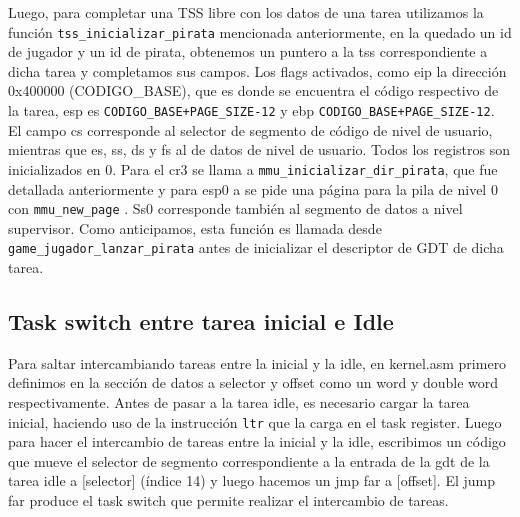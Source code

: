 Luego, para completar una TSS libre con los datos de una tarea utilizamos la función \texttt{tss\_inicializar\_pirata} mencionada anteriormente, en la quedado un id de jugador y un id de pirata, obtenemos un puntero a la tss correspondiente a dicha tarea y completamos sus campos. Los flags activados, como eip la dirección 0x400000 (CODIGO\_BASE), que es donde se encuentra el código respectivo de la tarea, esp es \texttt{CODIGO\_BASE+PAGE\_SIZE-12} y ebp \texttt{CODIGO\_BASE+PAGE\_SIZE-12}. El campo cs corresponde al selector de segmento de código de nivel de usuario, mientras que es, ss, ds y fs al de datos de nivel de usuario. Todos los registros son inicializados en 0. 
Para el cr3 se llama a \texttt{mmu\_inicializar\_dir\_pirata}, que fue detallada anteriormente y para  esp0 a  se pide una página para la pila de nivel 0 con \texttt{mmu\_new\_page} . Ss0 corresponde también al segmento de datos a nivel supervisor. Como anticipamos, esta función es llamada desde \texttt{game\_jugador\_lanzar\_pirata} antes de inicializar el descriptor de GDT de dicha tarea.

\subsection{Task switch entre tarea inicial e Idle}

Para saltar intercambiando tareas entre la inicial y la idle, en kernel.asm primero definimos en la sección de datos a selector y offset como un word y double word respectivamente.
Antes de pasar a la tarea idle, es necesario cargar la tarea inicial, haciendo uso de la instrucción \texttt{ltr} que la carga en el task register.
Luego para hacer el intercambio de tareas entre la inicial y la idle, escribimos un código que mueve el selector de segmento correspondiente a la entrada de la gdt de la tarea idle a [selector] (índice 14) y luego hacemos un jmp far a [offset]. El jump far produce el task switch que permite realizar el intercambio de tareas.

